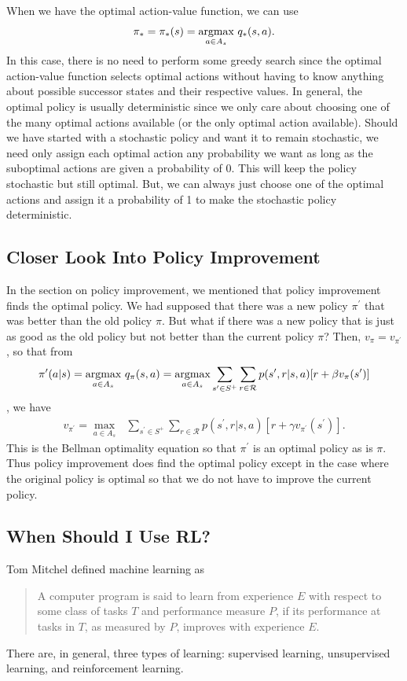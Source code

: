 When we have the optimal action-value function, we can use
\begin{align}
    \pi_*=\pi_*(s)=\underset{a\in A_s}{\mbox{argmax}}\text{ } q_*(s,a).
    \label{eq:optimal_policy_quality_def}
\end{align}
In this case, there is no need to perform some greedy search since the optimal action-value function selects optimal actions without having to know anything about possible successor states and their respective values.
In general, the optimal policy is usually deterministic since we only care about choosing one of the many optimal actions available (or the only optimal action available).
Should we have started with a stochastic policy and want it to remain stochastic, we need only assign each optimal action any probability we want as long as the suboptimal actions are given a probability of 0.
This will keep the policy stochastic but still optimal.
But, we can always just choose one of the optimal actions and assign it a probability of 1 to make the stochastic policy deterministic.

\subsection*{Closer Look Into Policy Improvement}
In the section on policy improvement, we mentioned that policy improvement finds the optimal policy.
We had supposed that there was a new policy $\pi^\prime$ that was better than the old policy $\pi$.
But what if there was a new policy that is just as good as the old policy but not better than the current policy $\pi$?
Then, $v_\pi = v_{\pi^\prime}$, so that from
\begin{align*}
    \pi^\prime(a|s)=\underset{a\in A_s}{\mbox{argmax}}\text{ } q_\pi(s,a)= \underset{a\in A_s}{\mbox{argmax}} \sum_{s^\prime\in S^+} \sum_{r\in\mathcal{R}} p(s^\prime,r|s,a)[r+\beta v_{\pi}(s^\prime)] \nonumber
\end{align*}, we have
\begin{align*}
    v_{\pi^\prime} = \underset{a\in A_s}{\max}\text{ } \sum_{s^\prime\in S^+} \sum_{r\in\mathcal{R}} p(s^\prime,r|s,a) [r+\gamma v_{\pi^\prime}(s^\prime)]. \nonumber
\end{align*}
This is the Bellman optimality equation so that $\pi^\prime$ is an optimal policy as is $\pi$.
Thus policy improvement does find the optimal policy except in the case where the original policy is optimal so that we do not have to improve the current policy.

\subsection*{When Should I Use RL?}
Tom Mitchel defined machine learning as
\begin{quote}
    A computer program is said to learn from experience $E$ with respect to some class of tasks $T$ and performance measure $P$, if its performance at tasks in $T$, as measured by $P$, improves with experience $E$.
\end{quote}
There are, in general, three types of learning: supervised learning, unsupervised learning, and reinforcement learning.

